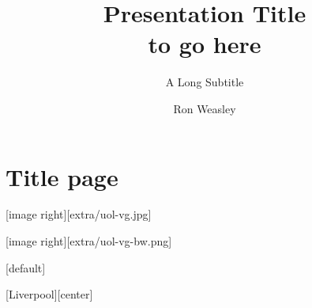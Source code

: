 \documentclass[
aspectratio=169,
]{beamer}
\title{Presentation Title\\to go here}
\subtitle{A Long Subtitle}
\author{Ron Weasley}
\institute{Computer Science} %
\begin{document}
\section{Title page}
%



{ %
[image right][extra/uol-vg.jpg]
\begin{frame}
    \maketitle
\end{frame}
}


[image right][extra/uol-vg-bw.png]  %
\begin{frame}[uolcolours=Pink]  %
\maketitle
\end{frame}
[default]  %


[Liverpool][center] %
\begin{frame}[uolcolours=Dark Green]
\maketitle
\end{frame}

\end{document}
